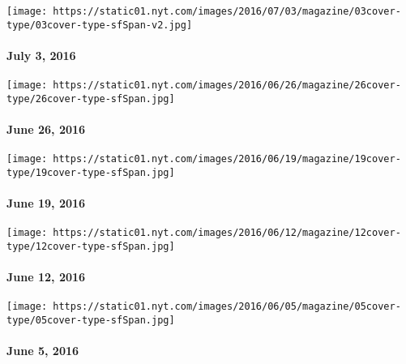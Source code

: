 \href{http://www.nytimes.com/indexes/2016/07/03/magazine/index.html}{}

\texttt{[image: https://static01.nyt.com/images/2016/07/03/magazine/03cover-type/03cover-type-sfSpan-v2.jpg]}

\hypertarget{july-3-2016}{%
\paragraph{July 3, 2016}\label{july-3-2016}}

\href{http://www.nytimes.com/indexes/2016/06/26/magazine/index.html}{}

\texttt{[image: https://static01.nyt.com/images/2016/06/26/magazine/26cover-type/26cover-type-sfSpan.jpg]}

\hypertarget{june-26-2016}{%
\paragraph{June 26, 2016}\label{june-26-2016}}

\href{http://www.nytimes.com/indexes/2016/06/19/magazine/index.html}{}

\texttt{[image: https://static01.nyt.com/images/2016/06/19/magazine/19cover-type/19cover-type-sfSpan.jpg]}

\hypertarget{june-19-2016}{%
\paragraph{June 19, 2016}\label{june-19-2016}}

\href{http://www.nytimes.com/indexes/2016/06/12/magazine/index.html}{}

\texttt{[image: https://static01.nyt.com/images/2016/06/12/magazine/12cover-type/12cover-type-sfSpan.jpg]}

\hypertarget{june-12-2016}{%
\paragraph{June 12, 2016}\label{june-12-2016}}

\href{http://www.nytimes.com/indexes/2016/06/05/magazine/index.html}{}

\texttt{[image: https://static01.nyt.com/images/2016/06/05/magazine/05cover-type/05cover-type-sfSpan.jpg]}

\hypertarget{june-5-2016}{%
\paragraph{June 5, 2016}\label{june-5-2016}}

